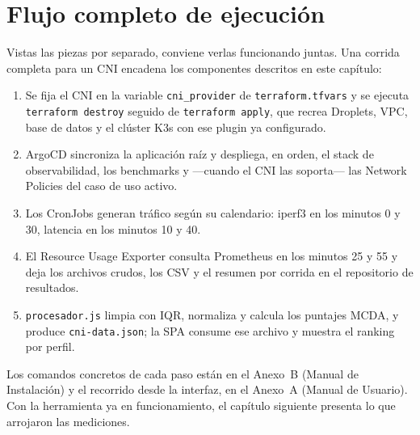 \section{Flujo completo de ejecución}

Vistas las piezas por separado, conviene verlas funcionando juntas. Una corrida completa para un CNI encadena los componentes descritos en este capítulo:

\begin{enumerate}
\item Se fija el CNI en la variable \texttt{cni\_provider} de \texttt{terraform.tfvars} y se ejecuta \texttt{terraform destroy} seguido de \texttt{terraform apply}, que recrea Droplets, VPC, base de datos y el clúster K3s con ese plugin ya configurado.
\item ArgoCD sincroniza la aplicación raíz y despliega, en orden, el stack de observabilidad, los benchmarks y ---cuando el CNI las soporta--- las Network Policies del caso de uso activo.
\item Los CronJobs generan tráfico según su calendario: iperf3 en los minutos 0 y 30, latencia en los minutos 10 y 40.
\item El Resource Usage Exporter consulta Prometheus en los minutos 25 y 55 y deja los archivos crudos, los CSV y el resumen por corrida en el repositorio de resultados.
\item \texttt{procesador.js} limpia con IQR, normaliza y calcula los puntajes MCDA, y produce \texttt{cni-data.json}; la SPA consume ese archivo y muestra el ranking por perfil.
\end{enumerate}

Los comandos concretos de cada paso están en el Anexo~B (Manual de Instalación) y el recorrido desde la interfaz, en el Anexo~A (Manual de Usuario). Con la herramienta ya en funcionamiento, el capítulo siguiente presenta lo que arrojaron las mediciones.
